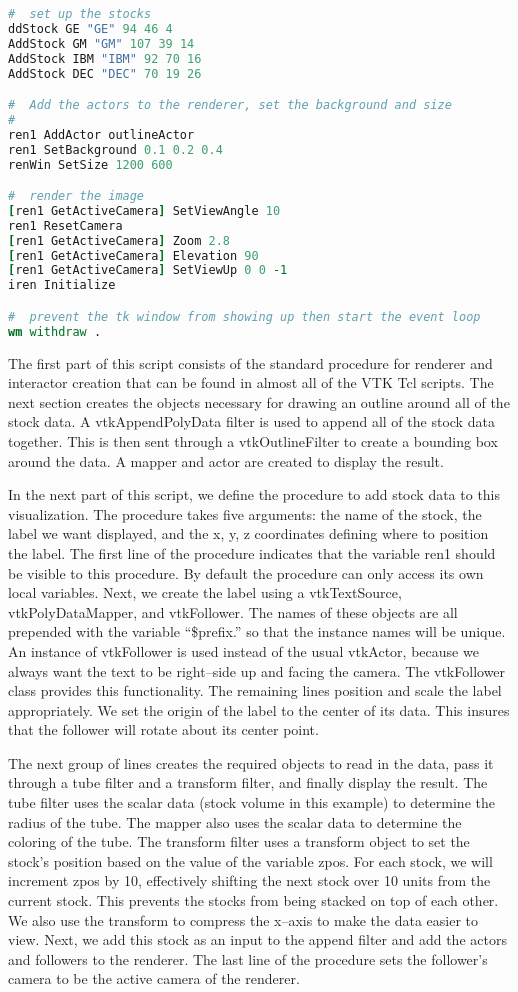 \begin{lstlisting}[language=TCL, caption={Tcl script for stock case study.}]
#  set up the stocks
ddStock GE "GE" 94 46 4
AddStock GM "GM" 107 39 14
AddStock IBM "IBM" 92 70 16
AddStock DEC "DEC" 70 19 26

#  Add the actors to the renderer, set the background and size
#
ren1 AddActor outlineActor
ren1 SetBackground 0.1 0.2 0.4
renWin SetSize 1200 600

#  render the image
[ren1 GetActiveCamera] SetViewAngle 10
ren1 ResetCamera
[ren1 GetActiveCamera] Zoom 2.8
[ren1 GetActiveCamera] Elevation 90
[ren1 GetActiveCamera] SetViewUp 0 0 -1
iren Initialize

#  prevent the tk window from showing up then start the event loop
wm withdraw .
\end{lstlisting}

The first part of this script consists of the standard procedure for renderer and interactor creation that can be found in almost all of the VTK Tcl scripts. The next section creates the objects necessary for drawing an outline around all of the stock data. A vtkAppendPolyData filter is used to append all of the stock data together. This is then sent through a vtkOutlineFilter to create a bounding box around the data. A mapper and actor are created to display the result.

In the next part of this script, we define the procedure to add stock data to this visualization. The procedure takes five arguments: the name of the stock, the label we want displayed, and the x, y, z coordinates defining where to position the label. The first line of the procedure indicates that the variable ren1 should be visible to this procedure. By default the procedure can only access its own local variables. Next, we create the label using a vtkTextSource, vtkPolyDataMapper, and vtkFollower. The names of these objects are all prepended with the variable ``\$prefix.'' so that the instance names will be unique. An instance of vtkFollower is used instead of the usual vtkActor, because we always want the text to be right--side up and facing the camera. The vtkFollower class provides this functionality. The remaining lines position and scale the label appropriately. We set the origin of the label to the center of its data. This insures that the follower will rotate about its center point.

The next group of lines creates the required objects to read in the data, pass it through a tube filter and a transform filter, and finally display the result. The tube filter uses the scalar data (stock volume in this example) to determine the radius of the tube. The mapper also uses the scalar data to determine the coloring of the tube. The transform filter uses a transform object to set the stock's position based on the value of the variable zpos. For each stock, we will increment zpos by 10, effectively shifting the next stock over 10 units from the current stock. This prevents the stocks from being stacked on top of each other. We also use the transform to compress the x--axis to make the data easier to view. Next, we add this stock as an input to the append filter and add the actors and followers to the renderer. The last line of the procedure sets the follower's camera to be the active camera of the renderer.

